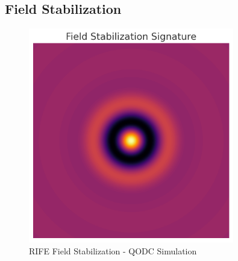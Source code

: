 \documentclass[11pt]{report}
\begin{document}
\subsection{Field Stabilization}
\begin{figure}[ht]
  \centering
  \includegraphics[width=0.8\textwidth]{simulations/field_stabilization.png}
  \caption{RIFE Field Stabilization - QODC Simulation}
\end{figure}
\end{document}
